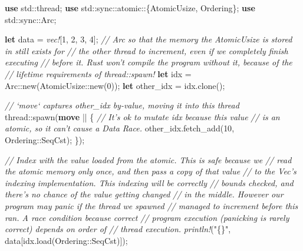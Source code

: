 \documentclass[a4paper,]{book}
\newenvironment{Shaded}{\begin{snugshade}}{\end{snugshade}}
\newcommand{\KeywordTok}[1]{\textcolor[rgb]{0.13,0.29,0.53}{\textbf{{#1}}}}
\newcommand{\DecValTok}[1]{\textcolor[rgb]{0.00,0.00,0.81}{{#1}}}
\newcommand{\StringTok}[1]{\textcolor[rgb]{0.31,0.60,0.02}{{#1}}}
\newcommand{\CommentTok}[1]{\textcolor[rgb]{0.56,0.35,0.01}{\textit{{#1}}}}
\newcommand{\PreprocessorTok}[1]{\textcolor[rgb]{0.56,0.35,0.01}{\textit{{#1}}}}
\newcommand{\NormalTok}[1]{{#1}}
\begin{document}
\begin{Shaded}
\begin{Highlighting}[]
\KeywordTok{use} \NormalTok{std::thread;}
\KeywordTok{use} \NormalTok{std::sync::atomic::\{AtomicUsize, Ordering\};}
\KeywordTok{use} \NormalTok{std::sync::Arc;}

\KeywordTok{let} \NormalTok{data = }\PreprocessorTok{vec!}\NormalTok{[}\DecValTok{1}\NormalTok{, }\DecValTok{2}\NormalTok{, }\DecValTok{3}\NormalTok{, }\DecValTok{4}\NormalTok{];}
\CommentTok{// Arc so that the memory the AtomicUsize is stored in still exists for}
\CommentTok{// the other thread to increment, even if we completely finish executing}
\CommentTok{// before it. Rust won't compile the program without it, because of the}
\CommentTok{// lifetime requirements of thread::spawn!}
\KeywordTok{let} \NormalTok{idx = Arc::new(AtomicUsize::new(}\DecValTok{0}\NormalTok{));}
\KeywordTok{let} \NormalTok{other_idx = idx.clone();}

\CommentTok{// `move` captures other_idx by-value, moving it into this thread}
\NormalTok{thread::spawn(}\KeywordTok{move} \NormalTok{|| \{}
    \CommentTok{// It's ok to mutate idx because this value}
    \CommentTok{// is an atomic, so it can't cause a Data Race.}
    \NormalTok{other_idx.fetch_add(}\DecValTok{10}\NormalTok{, Ordering::SeqCst);}
\NormalTok{\});}

\CommentTok{// Index with the value loaded from the atomic. This is safe because we}
\CommentTok{// read the atomic memory only once, and then pass a copy of that value}
\CommentTok{// to the Vec's indexing implementation. This indexing will be correctly}
\CommentTok{// bounds checked, and there's no chance of the value getting changed}
\CommentTok{// in the middle. However our program may panic if the thread we spawned}
\CommentTok{// managed to increment before this ran. A race condition because correct}
\CommentTok{// program execution (panicking is rarely correct) depends on order of}
\CommentTok{// thread execution.}
\PreprocessorTok{println!}\NormalTok{(}\StringTok{"\{\}"}\NormalTok{, data[idx.load(Ordering::SeqCst)]);}
\end{Highlighting}
\end{Shaded}
\end{document}
